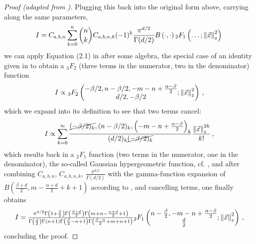 \begin{proof}[Proof (adapted from \cite{2021-arbitrary-dimensions})]
  Plugging this back into the original form above, carrying along the same parameters,
  \begin{align*}
    I = C_{a,b,n} \sum_{k=0}^n \binom{n}{k} C_{a,b,n,k} (-1)^k \frac{\pi^{d/2}}{\Gamma(d/2)} B\left(\cdot, \cdot\right) {}_2F_1\left(\dots; \left\lVert\vec{x}\right\rVert_{\scriptscriptstyle 2}^2\right)\,
  \end{align*}
  we can apply Equation (2.1) in \cite{2021-arbitrary-dimensions} after some algebra, the special case of an identity given in \cite{1986-crazy-hypergeometric-properties} to obtain a ${}_3F_2$ (three terms in the numerator, two in the denominator) function
  \begin{align*}
    I \propto {}_3F_2\left(\begin{matrix}-\beta/2, n-\beta/2, -m-n+\frac{\alpha-\beta}{2} \\d/2, -\beta/2\end{matrix}; \left\lVert\vec{x}\right\rVert_{\scriptscriptstyle 2}^2\right)\,,
  \end{align*}
  which we expand into its definition  to see that two terms cancel:
  \begin{align*}
    I \propto \sum_{k=0}^{\infty} \frac{\cancel{(-\beta/2)_k}, (n-\beta/2)_k, \left(-m-n+\frac{\alpha-\beta}{2}\right)_k}{(d/2)_k \cancel{(-\beta/2)_k}} \frac{\left\lVert\vec{x}\right\rVert_{\scriptscriptstyle 2}^{2k}}{k!}\,,
  \end{align*}
  which results back in a ${}_2F_1$ function (two terms in the numerator, one in the denominator), the so-called Gaussian hypergeometric function, cf. , and after combining $C_{a,b,n}$, $C_{a,b,n,k}$, $\frac{\pi^{d/2}}{\Gamma(d/2)}$ with the gamma-function expansion of $B\left(\tfrac{\beta+d}{2}, m-\tfrac{\alpha+d}{2}+k+1\right)$ according to , and cancelling terms, one finally obtains
  $$I = \tfrac{\pi^{d/2} \Gamma \left(1+\frac{\beta}{2}\right) \Gamma \left(\frac{\beta+d}{2}\right) \Gamma \left(m+n-\frac{\alpha+d}{2}+1\right)}{\Gamma \left(\frac{d}{2}\right) \Gamma (n+1) \Gamma \left(\frac{\beta}{2}-n+1\right) \Gamma \left(\frac{\beta-\alpha}{2}+m+n+1\right)}{}_2F_1\left(\begin{matrix}n-\frac{\beta}{2}, -m-n+\frac{\alpha-\beta}{2} \\\frac{d}{2}\end{matrix};\left\lVert\vec{x}\right\rVert_{\scriptscriptstyle 2}^2\right)\,,$$
  concluding the proof.
\end{proof}
